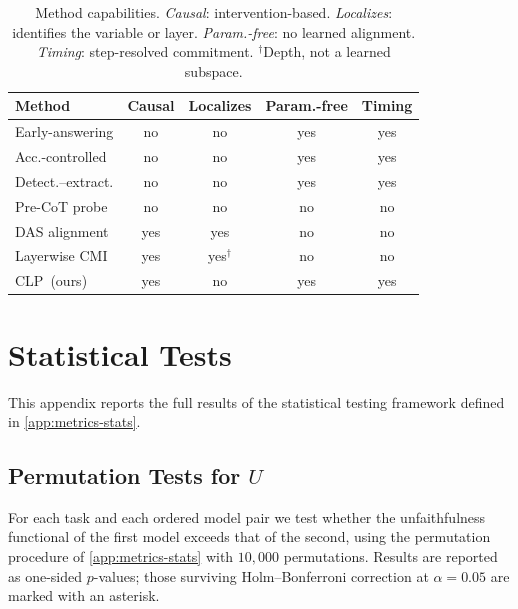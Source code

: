 \documentclass[11pt]{article}
\newcommand{\CLP}{\textsc{CLP}}
\begin{document}
\begin{table}[t]
\centering\small
\setlength{\tabcolsep}{4pt}
\begin{tabular}{@{}lcccc@{}}
\toprule
Method & Causal & Localizes & Param.-free & Timing \\
\midrule
Early-answering        & no  & no  & yes & yes \\
Acc.-controlled        & no  & no  & yes & yes \\
Detect.--extract.    & no  & no  & yes & yes \\
Pre-CoT probe          & no  & no  & no  & no  \\
DAS alignment          & yes & yes & no  & no  \\
Layerwise CMI          & yes & yes$^{\dagger}$ & no  & no  \\
\CLP\ (ours)           & yes & no  & yes & yes \\
\bottomrule
\end{tabular}
\caption{Method capabilities. \emph{Causal}: intervention-based.
\emph{Localizes}: identifies the variable or layer.
\emph{Param.-free}: no learned alignment.
\emph{Timing}: step-resolved commitment.
$^{\dagger}$Depth, not a learned subspace.}
\label{tab:capability}
\end{table}

\section{Statistical Tests}
\label{app:stattests}

This appendix reports the full results of the statistical testing framework
defined in \cref{app:metrics-stats}.

\subsection{Permutation Tests for $U$}
\label{app:stattests-perm}

For each task and each ordered model pair we test whether the unfaithfulness
functional of the first model exceeds that of the second, using the permutation
procedure of \cref{app:metrics-stats} with $10{,}000$ permutations. Results
are reported as one-sided $p$-values; those surviving Holm--Bonferroni
correction at $\alpha=0.05$ are marked with an asterisk.
\end{document}
